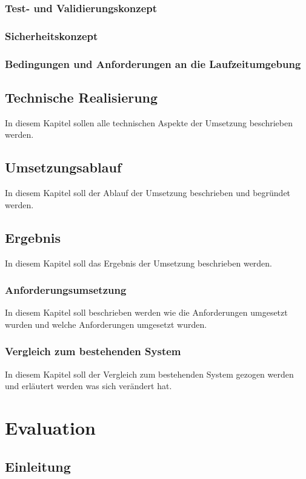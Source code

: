 \documentclass[a4paper,10pt,twoside]{report}
\begin{document}
\subsection{Test- und Validierungskonzept}
\subsection{Sicherheitskonzept}
\subsection{Bedingungen und Anforderungen an die Laufzeitumgebung}

\section{Technische Realisierung}
In diesem Kapitel sollen alle technischen Aspekte der Umsetzung beschrieben werden.
\section{Umsetzungsablauf}
In diesem Kapitel soll der Ablauf der Umsetzung beschrieben und begründet werden.
\section{Ergebnis}
In diesem Kapitel soll das Ergebnis der Umsetzung beschrieben werden.
\subsection{Anforderungsumsetzung}
In diesem Kapitel soll beschrieben werden wie die Anforderungen umgesetzt wurden und welche Anforderungen umgesetzt wurden.
\subsection{Vergleich zum bestehenden System}
In diesem Kapitel soll der Vergleich zum bestehenden System gezogen werden und erläutert werden was sich verändert hat.



\chapter{Evaluation}

\section{Einleitung}
\end{document}
